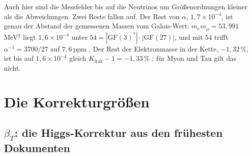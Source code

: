 Auch hier sind die Messfehler bis auf die Neutrinos um Größenordnungen kleiner als die
Abweichungen. Zwei Reste fallen auf. Der Rest von $\alpha$, $1{,}7\times10^{-4}$, ist genau der
Abstand der gemessenen Massen vom Galois-Wert: $m_em_\mu=53{,}991$\,MeV$^2$ liegt
$1{,}6\times10^{-4}$ unter $54=|\mathrm{GF}(3)^*|\cdot|\mathrm{GF}(27)|$, und mit $54$ trifft
$\alpha^{-1}=3700/27$ auf $7{,}6$\,ppm \KM. Der Rest der Elektronmasse in der Kette, $-1{,}32\,\%$,
ist bis auf $1{,}6\times10^{-4}$ gleich $K_{\text{frak}}-1=-1{,}33\,\%$ \KM; für Myon und Tau gilt
das nicht.

\section{Die Korrekturgrößen}

\subsection{\texorpdfstring{$\beta_T$}{beta\_T}: die Higgs-Korrektur aus den frühesten Dokumenten}

